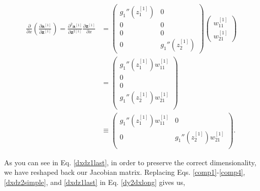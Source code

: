 \documentclass{article}
\begin{document}
\begin{align}
\frac{\partial}{\partial x} \left(\frac{\partial \textbf{a}^{[1]}}{\partial \textbf{z}^{[1]}}\right)= \frac{\partial^2 \textbf{a}^{[1]}}{\partial \textbf{z}^{2{[1]}}}  \frac{\partial \textbf{z}^{[1]}}{\partial x} &= \begin{pmatrix}
g_1''(z_1^{[1]})  & 0 \\ 0 & 0 \\
0 & 0 \\ 0 & g_1''(z_2^{[1]})
\end{pmatrix}
\begin{pmatrix}
w_{11}^{[1]} \\
w_{21}^{[1]}
\end{pmatrix} \\
&=
\begin{pmatrix}
g_1''(z_1^{[1]}) w_{11}^{[1]} \\
0\\
0\\
g_1''(z_2^{[1]}) w_{21}^{[1]} \\
\end{pmatrix} \\
&\equiv
\begin{pmatrix}
g_1''(z_1^{[1]}) w_{11}^{[1]} & 0 \\
0 & g_1''(z_2^{[1]}) w_{21}^{[1]} \\
\end{pmatrix}. 
\label{dxdz1last}
\end{align}

As you can see in Eq. \eqref{dxdz1last}, in order to preserve the correct dimensionality, we have reshaped back our Jacobian matrix.
Replacing Eqs. \eqref{comp1}-\eqref{comp4}, \eqref{dxdz2simple}, and \eqref{dxdz1last} in Eq. \eqref{dy2dxlong} gives us,
\end{document}
